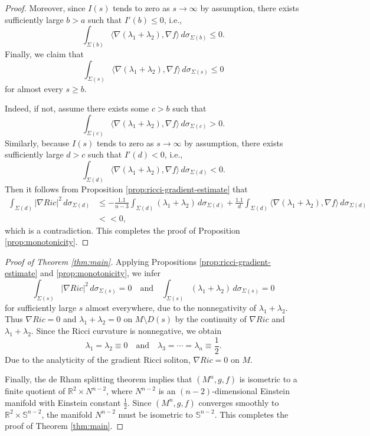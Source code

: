 \documentclass[a4, 12pt]{amsart}
\theoremstyle{plain}
\begin{document}
\begin{proof}
	Moreover, since $I(s)$ tends to zero as $s \to \infty$ by assumption, there exists sufficiently large $b > a$ such that $I'(b) \leq 0$, i.e.,
	\[
	\int_{\Sigma(b)} \langle \nabla(\lambda_1+\lambda_2), \nabla f \rangle \, d\sigma_{\Sigma(b)} \leq 0.
	\]
	Finally, we claim that
	\[
	\int_{\Sigma(s)} \langle\nabla (\lambda_1+\lambda_2), \nabla f \rangle \, d\sigma_{\Sigma(s)} \leq 0
	\]
	for almost every $s \geq b$.
	
	Indeed, if not, assume there exists some $c > b$ such that
	\[
	\int_{\Sigma(c)} \langle\nabla (\lambda_1+\lambda_2), \nabla f \rangle \, d\sigma_{\Sigma(c)} > 0.
	\]
	Similarly, because $I(s)$ tends to zero as $s \to \infty$ by assumption, there exists sufficiently large $d > c$ such that $I'(d) < 0$, i.e.,
	\[
	\int_{\Sigma(d)} \langle\nabla (\lambda_1+\lambda_2), \nabla f \rangle \, d\sigma_{\Sigma(d)} < 0.
	\]
	Then it follows from Proposition \ref{prop:ricci-gradient-estimate} that
	\begin{align*}
		\int_{\Sigma(d)}|\nabla Ric|^2 \, d\sigma_{\Sigma(d)} &\leq -\frac{1.1}{n-3}\int_{\Sigma(d)} (\lambda_1+\lambda_2)\, d\sigma_{\Sigma(d)} + \frac{1.1}{d}\int_{\Sigma(d)} \langle\nabla (\lambda_1+\lambda_2), \nabla f \rangle \, d\sigma_{\Sigma(d)} \\
		&<< 0,
	\end{align*}
	which is a contradiction. This completes the proof of Proposition \ref{prop:monotonicity}.
\end{proof}

\begin{proof}[Proof of Theorem \ref{thm:main}]
	Applying Propositions \ref{prop:ricci-gradient-estimate} and \ref{prop:monotonicity}, we infer
	\[
	\int_{\Sigma(s)}|\nabla Ric|^2 \, d\sigma_{\Sigma(s)} = 0 \quad \text{and} \quad \int_{\Sigma(s)} (\lambda_1+\lambda_2)\, d\sigma_{\Sigma(s)} = 0
	\]
	for sufficiently large $s$ almost everywhere, due to the nonnegativity of $\lambda_1+\lambda_2$. Thus $\nabla Ric = 0$ and $\lambda_1+\lambda_2 = 0$ on $M \setminus D(s)$ by the continuity of $\nabla Ric$ and $\lambda_1+\lambda_2$.
	Since the Ricci curvature is nonnegative, we obtain
	\[
	\lambda_1 = \lambda_2 \equiv 0 \quad \text{and} \quad \lambda_3 = \cdots = \lambda_n \equiv \frac{1}{2}.
	\]
	Due to the analyticity of the gradient Ricci soliton, $\nabla Ric = 0$ on $M$.
	
	Finally, the de Rham splitting theorem implies that $(M^n, g, f)$ is isometric to a finite quotient of $\mathbb{R}^2 \times {N}^{n-2}$, where ${N}^{n-2}$ is an $(n-2)$-dimensional Einstein manifold with Einstein constant $\frac{1}{2}$. Since $(M^n, g, f)$ converges smoothly to $\mathbb{R}^2 \times \mathbb{S}^{n-2}$, the manifold ${N}^{n-2}$ must be isometric to $\mathbb{S}^{n-2}$. This completes the proof of Theorem \ref{thm:main}.
\end{proof}
\end{document}
